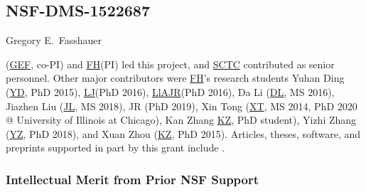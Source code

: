 \documentclass[11pt]{NSFamsart}
\newcommand{\FH}{\hyperlink{FHlink}{FH}\xspace}
\newcommand{\SCTC}{\hyperlink{SCTClink}{SCTC}\xspace}
\newcommand{\GEF}{\hyperlink{GEFlink}{GEF}\xspace}
\newcommand{\YD}{\hyperlink{YDlink}{YD}\xspace}
\newcommand{\LlAJR}{\hyperlink{LlAJRlink}{LlAJR}\xspace}
\newcommand{\LJ}{\hyperlink{LJlink}{LJ}\xspace}
\newcommand{\XT}{\hyperlink{XTlink}{XT}\xspace}
\newcommand{\KZ}{\hyperlink{KZlink}{KZ}\xspace}
\newcommand{\DL}{\hyperlink{DLlink}{DL}\xspace}
\newcommand{\XZ}{\hyperlink{XZlink}{KZ}\xspace}
\newcommand{\JL}{\hyperlink{JLlink}{JL}\xspace}
\newcommand{\YZ}{\hyperlink{YZlink}{YZ}\xspace}
\def\abs#1{\ensuremath{\left \lvert #1 \right \rvert}}
\begin{document}
\subsection{NSF-DMS-1522687
} \label{sec:PreviousFred}

\hypertarget{GEFlink}{Gregory E.\ Fasshauer} (\GEF, co-PI) and \FH (PI) led this project, and \SCTC contributed as senior personnel.  Other major contributors were \FH's research students \hypertarget{YDlink}{Yuhan Ding} (\YD, PhD 2015), \LJ (PhD 2016),
\LlAJR (PhD 2016), \hypertarget{DLlink}{Da Li} (\DL, MS 2016), \hypertarget{JLlink}{Jiazhen Liu} (\JL, MS 2018), JR (PhD 2019), \hypertarget{XTlink}{Xin Tong} (\XT, MS 2014, PhD 2020 @ University of Illinois at Chicago), \hypertarget{KZlink}{Kan Zhang} \KZ, PhD student), \hypertarget{YZlink}{Yizhi Zhang} (\YZ, PhD 2018), and \hypertarget{XZlink}{Xuan Zhou} (\XZ, PhD 2015).  Articles, theses,
software, and preprints supported in
part by this
grant
include
\cite{ala_augmented_2017,
	ChoEtal17a,
	ChoEtal20a,
	Din15a,
	DinHic20a,
	GilEtal16a,
	Hic17a,
	HicJag18b,
	HicJim16a,
	HicEtal18a,
	HicEtal17a,
	HicKriWoz19a,
	RatHic19a,
	GilJim16b,
	JimHic16a,
	JohFasHic18a,
	Li16a,
	Liu17a,
	MarEtal18a,
	mccourt_stable_2017,
	MCCEtal19a,
	mishra_hybrid_2018,
	MisEtal19a,
	rashidinia_stable_2016,
	rashidinia_stable_2018,
	Zha18a,
	Zha17a,
	Zho15a,
	ZhoHic15a}.

\subsubsection{Intellectual Merit from Prior NSF Support}
\label{previousmeritsubsec}
\phantom{a}

\end{document}
